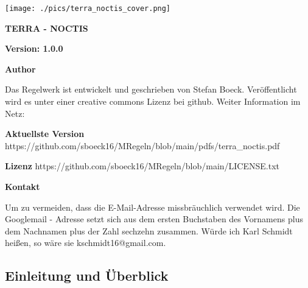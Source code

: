 \documentclass{article}
\begin{document}
\begin{titlepage}
\centering
\texttt{[image: ./pics/terra\_noctis\_cover.png]}
\vspace{2cm}
\newline\hline
\vspace{1cm}
{\Huge\textbf{TERRA - NOCTIS}\par}
\vspace{1cm}
\newline\hline
\vfill
\end{titlepage}
\sloppy

\textbf{Version: 1.0.0}

\vspace{1cm}
\newline\hline
\vspace{1cm}

\textbf{Author}

\newline

Das Regelwerk ist entwickelt und geschrieben von Stefan Boeck. Veröffentlicht wird es unter einer creative commons Lizenz
bei github. Weiter Information im Netz:

\newline
\vspace{1cm}
\textbf{Aktuellste Version} https://github.com/sboeck16/MRegeln/blob/main/pdfs/terra\_noctis.pdf

\newline
\vspace{5mm}
\textbf{Lizenz} https://github.com/sboeck16/MRegeln/blob/main/LICENSE.txt

\vspace{5mm}
\newline\hline
\vspace{1cm}

\textbf{Kontakt}

\newline

Um zu vermeiden, dass die E-Mail-Adresse missbräuchlich verwendet wird. Die Googlemail - Adresse setzt sich aus dem
ersten Buchstaben des Vornamens plus dem Nachnamen plus der Zahl sechzehn zusammen. Würde ich Karl Schmidt heißen,
so wäre sie kschmidt16@gmail.com.

\newpage\tableofcontents
\newpage
\begin{center}
\section{Einleitung und Überblick}
\end{center}
\end{document}

